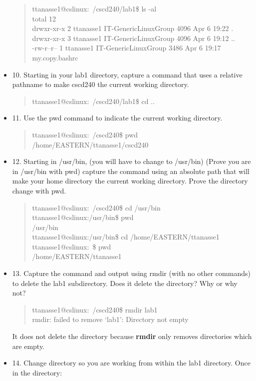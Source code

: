 \documentclass{article}
\begin{document}
\begin{itemize}
\begin{quote}
    ttanasse1@cslinux:~/cscd240/lab1\$ ls -al\\
total 12\\
drwxr-xr-x 2 ttanasse1 IT-GenericLinuxGroup 4096 Apr  6 19:22 .\\
drwxr-xr-x 3 ttanasse1 IT-GenericLinuxGroup 4096 Apr  6 19:12 ..\\
-rw-r--r-- 1 ttanasse1 IT-GenericLinuxGroup 3486 Apr  6 19:17 my.copy.bashrc
  \end{quote}
  \item 10. Starting in your lab1 directory, capture a command that uses a relative pathname to make cscd240 the current working directory.
  \begin{quote}
    ttanasse1@cslinux:~/cscd240/lab1\$ cd ..
  \end{quote}
  \item 11. Use the pwd command to indicate the current working directory.
  \begin{quote}
    ttanasse1@cslinux:~/cscd240\$ pwd\\
/home/EASTERN/ttanasse1/cscd240
  \end{quote}
  \item 12. Starting in /usr/bin, (you will have to change to /usr/bin) (Prove you are in /usr/bin with pwd) capture the command using an absolute path that will make your home directory the current working directory. Prove the directory change with pwd.
  \begin{quote}
    ttanasse1@cslinux:~/cscd240\$ cd /usr/bin\\
ttanasse1@cslinux:/usr/bin\$ pwd\\
/usr/bin\\
ttanasse1@cslinux:/usr/bin\$ cd /home/EASTERN/ttanasse1\\
ttanasse1@cslinux:~\$ pwd\\
/home/EASTERN/ttanasse1
  \end{quote}
  \item 13. Capture the command and output using rmdir (with no other commands) to delete the lab1 subdirectory. Does it delete the directory? Why or why not?  
  \begin{quote}
    ttanasse1@cslinux:~/cscd240\$ rmdir lab1\\
rmdir: failed to remove `lab1': Directory not empty
  \end{quote}
  It does not delete the directory because \textbf{rmdir} only removes directories which are empty.
  \item 14. Change directory so you are working from within the lab1 directory. Once in the directory:

\end{itemize}
\end{document}
